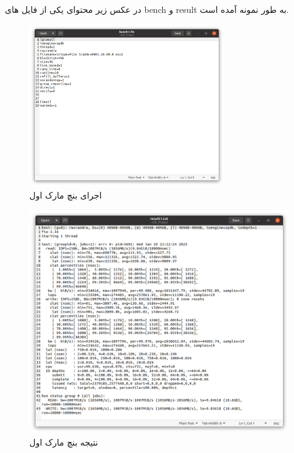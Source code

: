 در عکس زیر محتوای یکی از فایل های bench و result به طور نمونه آمده است.

\begin{figure}[H]
    \centering
    \includegraphics[width=0.75\textwidth]{figs/bfile.png}
    \caption{اجرای بنچ مارک اول}
\end{figure}

\begin{figure}[H]
    \centering
    \includegraphics[width=\textwidth]{figs/rfile.png}
    \caption{نتیجه بنچ مارک اول}
\end{figure}


